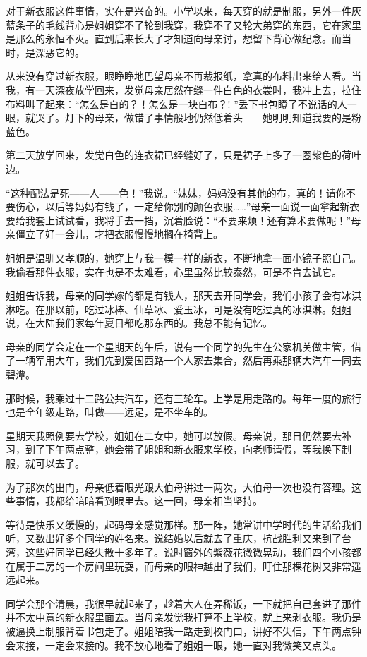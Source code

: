 \par 对于新衣服这件事情，实在是兴奋的。小学以来，每天穿的就是制服，另外一件灰蓝条子的毛线背心是姐姐穿不了轮到我穿，我穿不了又轮大弟穿的东西，它在家里是那么的永恒不灭。直到后来长大了才知道向母亲讨，想留下背心做纪念。而当时，是深恶它的。
\par 从来没有穿过新衣服，眼睁睁地巴望母亲不再裁报纸，拿真的布料出来给人看。当我，有一天深夜放学回来，发觉母亲居然在缝一件白色的衣裳时，我冲上去，拉住布料叫了起来：“怎么是白的？！怎么是一块白布？! ”丢下书包瞪了不说话的人一眼，就哭了。灯下的母亲，做错了事情般地仍然低着头——她明明知道我要的是粉蓝色。
\par 第二天放学回来，发觉白色的连衣裙已经缝好了，只是裙子上多了一圈紫色的荷叶边。
\par “这种配法是死——人——色！”我说。“妹妹，妈妈没有其他的布，真的！请你不要伤心，以后等妈妈有钱了，一定给你别的颜色衣服……”母亲一面说一面拿起新衣要给我套上试试看，我将手去一挡，沉着脸说：“不要来烦！还有算术要做呢！”母亲僵立了好一会儿，才把衣服慢慢地搁在椅背上。
\par 姐姐是温驯又孝顺的，她穿上与我一模一样的新衣，不断地拿一面小镜子照自己。我偷看那件衣服，实在也是不太难看，心里虽然比较泰然，可是不肯去试它。
\par 姐姐告诉我，母亲的同学嫁的都是有钱人，那天去开同学会，我们小孩子会有冰淇淋吃。在那以前，吃过冰棒、仙草冰、爱玉冰，可是没有吃过真的冰淇淋。姐姐说，在大陆我们家每年夏日都吃那东西的。我总不能有记忆。
\par 母亲的同学会定在一个星期天的午后，说有一个同学的先生在公家机关做主管，借了一辆军用大车，我们先到爱国西路一个人家去集合，然后再乘那辆大汽车一同去碧潭。
\par 那时候，我乘过十二路公共汽车，还有三轮车。上学是用走路的。每年一度的旅行也是全年级走路，叫做——远足，是不坐车的。
\par 星期天我照例要去学校，姐姐在二女中，她可以放假。母亲说，那日仍然要去补习，到了下午两点整，她会带了姐姐和新衣服来学校，向老师请假，等我换下制服，就可以去了。
\par 为了那次的出门，母亲低着眼光跟大伯母讲过一两次，大伯母一次也没有答理。这些事情，我都给暗暗看到眼里去。这一回，母亲相当坚持。
\par 等待是快乐又缓慢的，起码母亲感觉那样。那一阵，她常讲中学时代的生活给我们听，又数出好多个同学的姓名来。说结婚以后就去了重庆，抗战胜利又来到了台湾，这些好同学已经失散十多年了。说时窗外的紫薇花微微晃动，我们四个小孩都在属于二房的一个房间里玩耍，而母亲的眼神越出了我们，盯住那棵花树又非常遥远起来。
\par 同学会那个清晨，我很早就起来了，趁着大人在弄稀饭，一下就把自己套进了那件并不太中意的新衣服里面去。当母亲发觉我打算不上学校，就上来剥衣服。我仍是被逼换上制服背着书包走了。姐姐陪我一路走到校门口，讲好不失信，下午两点钟会来接，一定会来接的。我不放心地看了姐姐一眼，她一直对我微笑又点头。
